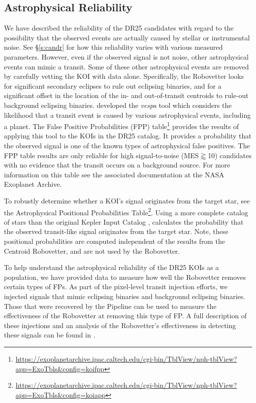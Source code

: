 \subsection{Astrophysical Reliability}
We have described the reliability of the DR25 candidates with regard to the possibility that the observed events are actually caused by stellar or instrumental noise. See \S\ref{s:candr} for how this reliability varies with various measured parameters.  However, even if the observed signal is not noise, other astrophysical events can mimic a transit.  Some of these other astrophysical events are removed by carefully vetting the KOI with \Kepler{} data alone.  Specifically, the Robovetter looks for significant secondary eclipses to rule out eclipsing binaries, and for a significant offset in the location of the in- and out-of-transit centroids to rule-out background eclipsing binaries. \citet[][]{Morton2016} developed the \textit{vespa} tool which considers the likelihood that a transit event is caused by various astrophysical events, including a planet.  The False Positive Probabilities (FPP) table\footnote{\url{https://exoplanetarchive.ipac.caltech.edu/cgi-bin/TblView/nph-tblView?app=ExoTbls&config=koifpp}} provides the results of applying this tool to the KOIs in the DR25 catalog. It provides a probability that the observed signal is one of the known types of astrophysical false positives.  The FPP table results are only reliable for high signal-to-noise (MES$\gtrapprox$10) candidates with no evidence that the transit occurs on a background source.  For more information on this table see the associated documentation at the NASA Exoplanet Archive.

To robustly determine whether a KOI's signal originates from the target star, see the Astrophysical Positional Probabilities Table\footnote{\url{https://exoplanetarchive.ipac.caltech.edu/cgi-bin/TblView/nph-tblView?app=ExoTbls&config=koiapp}}.  Using a more complete catalog of stars than the original Kepler Input Catalog \citep{Brown2011}, \citet{Bryson2017a} calculates the probability that the observed transit-like signal originates from the target star. Note, these positional probabilities are computed independent of the results from the Centroid Robovetter, and are not used by the Robovetter. 

To help understand the astrophysical reliability of the DR25 KOIs as a population, we have provided data to measure how well the Robovetter removes certain types of FPs.  As part of the pixel-level transit injection efforts, we injected signals that mimic eclipsing binaries and background eclipsing binaries. Those that were recovered by the \Kepler{} Pipeline can be used to measure the effectiveness of the Robovetter at removing this type of FP. A full description of these injections and an analysis of the Robovetter's effectiveness in detecting these signals can be found in \citet{Coughlin2017a}.


